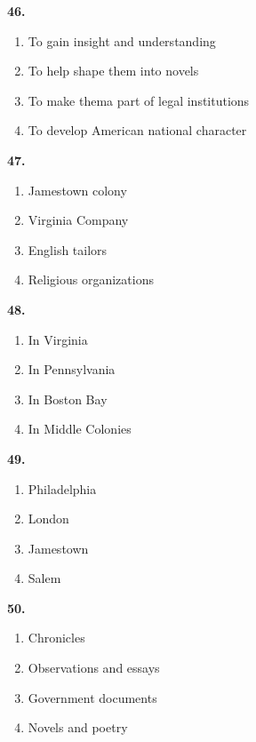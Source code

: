 \documentclass[12pt]{article}
\begin{document}
\par
\vspace{0.25\baselineskip}
\noindent\textbf{46.}
\begin{enumerate}[label=(\Alph*),leftmargin=*,itemsep=0.2em]
\item To gain insight and understanding
\item To help shape them into novels
\item To make thema part of legal institutions
\item To develop American national character
\end{enumerate}
\par
\vspace{0.25\baselineskip}
\noindent\textbf{47.}
\begin{enumerate}[label=(\Alph*),leftmargin=*,itemsep=0.2em]
\item Jamestown colony
\item Virginia Company
\item English tailors
\item Religious organizations
\end{enumerate}
\par
\vspace{0.25\baselineskip}
\noindent\textbf{48.}
\begin{enumerate}[label=(\Alph*),leftmargin=*,itemsep=0.2em]
\item In Virginia
\item In Pennsylvania
\item In Boston Bay
\item In Middle Colonies
\end{enumerate}
\par
\vspace{0.25\baselineskip}
\noindent\textbf{49.}
\begin{enumerate}[label=(\Alph*),leftmargin=*,itemsep=0.2em]
\item Philadelphia
\item London
\item Jamestown
\item Salem
\end{enumerate}
\par
\vspace{0.25\baselineskip}
\noindent\textbf{50.}
\begin{enumerate}[label=(\Alph*),leftmargin=*,itemsep=0.2em]
\item Chronicles
\item Observations and essays
\item Government documents
\item Novels and poetry
\end{enumerate}
\par
\vspace{0.25\baselineskip}
\end{document}
